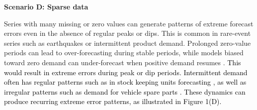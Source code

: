 \documentclass[12pt]{article}
\newcommand{\matt}[1]{\textcolor{black}{#1}}
\newenvironment{scenario}[1]{%
  \par\vspace{1ex}\noindent\textbf{#1}\par\vspace{0.5ex}}{\par}
\begin{document}
\begin{scenario}{Scenario D: Sparse data}

Series with many missing or zero values can generate patterns of extreme forecast errors even in the absence of regular peaks or dips. This is common in rare-event series %
such as earthquakes or intermittent product demand. Prolonged zero-value periods can lead to over-forecasting during stable periods, while models biased toward zero demand can under-forecast when positive demand resumes \citep{wang2024b}. \matt{This would result in extreme errors during peak or dip periods. Intermittent demand often has regular patterns such as in stock keeping units forecasting \citep{nikolopoulos2021}, as well as irregular patterns %
such as demand for vehicle spare parts \citep{jiang2021}. These dynamics can produce recurring extreme error patterns, as illustrated in Figure 1(D).}
\end{scenario}
\end{document}
